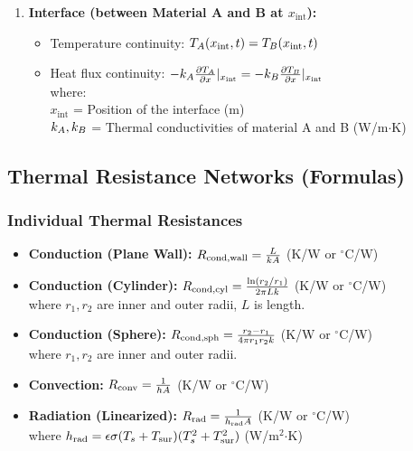 \begin{enumerate}
    \quad $\T(x_0, \tVar)$ = Absolute temperature of the surface (K) \\
    \quad $\T_{\text{sur}}$ = Absolute temperature of the surroundings (K)
    \item \textbf{Interface (between Material A and B at $x_{\text{int}}$):}
        \begin{itemize}
            \item Temperature continuity: $T_A(x_{\text{int}}, t) = T_B(x_{\text{int}}, t)$
            \item Heat flux continuity: $-k_A \frac{\partial T_A}{\partial x}|_{x_{\text{int}}} = -k_B \frac{\partial T_B}{\partial x}|_{x_{\text{int}}}$ \\
            \quad where: \\
            \quad $x_{\text{int}}$ = Position of the interface (m) \\
            \quad $k_A, k_B$ = Thermal conductivities of material A and B (W/m$\cdot$K)
        \end{itemize}
\end{enumerate}

\subsection{Thermal Resistance Networks (Formulas)}
\subsubsection*{Individual Thermal Resistances}
\begin{itemize}
    \item \textbf{Conduction (Plane Wall):} $R_{\text{cond,wall}} = \frac{L}{k A}$ (K/W or $^\circ$C/W)
    \item \textbf{Conduction (Cylinder):} $R_{\text{cond,cyl}} = \frac{\ln(r_2/r_1)}{2\pi L k}$ (K/W or $^\circ$C/W) \\
    \quad where $r_1, r_2$ are inner and outer radii, $L$ is length.
    \item \textbf{Conduction (Sphere):} $R_{\text{cond,sph}} = \frac{r_2 - r_1}{4\pi r_1 r_2 k}$ (K/W or $^\circ$C/W) \\
    \quad where $r_1, r_2$ are inner and outer radii.
    \item \textbf{Convection:} $R_{\text{conv}} = \frac{1}{h A}$ (K/W or $^\circ$C/W)
    \item \textbf{Radiation (Linearized):} $R_{\text{rad}} = \frac{1}{h_{\text{rad}} A}$ (K/W or $^\circ$C/W) \\
    \quad where $h_{\text{rad}} = \epsilon \sigma (T_s + T_{\text{sur}})(T_s^2 + T_{\text{sur}}^2)$ (W/m$^2$$\cdot$K)
\end{itemize}

